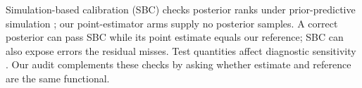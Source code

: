 Simulation-based calibration (SBC) checks posterior ranks under prior-predictive
simulation \citep{talts2018}; our point-estimator arms supply no posterior
samples. A correct posterior can pass SBC while its point estimate equals our
reference; SBC can also expose errors the residual misses. Test quantities
affect diagnostic sensitivity \citep{modrak2025}. Our audit complements these
checks by asking whether estimate and reference are the same functional.
